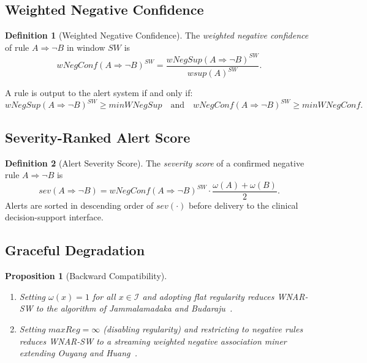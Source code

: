 \documentclass[10pt,twocolumn]{article}
\theoremstyle{plain}
\newtheorem{proposition}[theorem]{Proposition}
\theoremstyle{definition}
\newtheorem{definition}{Definition}[section]
\theoremstyle{remark}
\newcommand{\wsup}{\mathit{wsup}}
\newcommand{\wNegSup}{\mathit{wNegSup}}
\newcommand{\wNegConf}{\mathit{wNegConf}}
\newcommand{\SW}{\mathit{SW}}
\begin{document}
\subsection{Weighted Negative Confidence}

\begin{definition}[Weighted Negative Confidence]
\label{def:wnegconf}
The \emph{weighted negative confidence} of rule
$A \Rightarrow \lnot B$ in window $\SW$ is
\begin{equation}
  \wNegConf(A \Rightarrow \lnot B)^{\SW}
    = \frac{\wNegSup(A \Rightarrow \lnot B)^{\SW}}{\wsup(A)^{\SW}}.
  \label{eq:wnegconf}
\end{equation}
\end{definition}

A rule is output to the alert system if and only if:
\[
  \wNegSup(A \Rightarrow \lnot B)^{\SW} \geq \mathit{minWNegSup}
  \quad\text{and}\quad
  \wNegConf(A \Rightarrow \lnot B)^{\SW} \geq \mathit{minWNegConf}.
\]

\subsection{Severity-Ranked Alert Score}

\begin{definition}[Alert Severity Score]
\label{def:severity}
The \emph{severity score} of a confirmed negative rule
$A \Rightarrow \lnot B$ is
\begin{equation}
  \mathit{sev}(A \Rightarrow \lnot B)
    = \wNegConf(A \Rightarrow \lnot B)^{\SW}
      \cdot \frac{\omega(A) + \omega(B)}{2}.
  \label{eq:severity}
\end{equation}
Alerts are sorted in descending order of $\mathit{sev}(\cdot)$
before delivery to the clinical decision-support interface.
\end{definition}

\subsection{Graceful Degradation}

\begin{proposition}[Backward Compatibility]
\label{prop:degradation}
\begin{enumerate}[label=(\roman*)]
  \item Setting $\omega(x) = 1$ for all $x \in \mathcal{I}$ and
        adopting flat regularity reduces WNAR-SW to the algorithm
        of Jammalamadaka and Budaraju~\cite{sastry2025}.
  \item Setting $\mathit{maxReg} = \infty$ (disabling regularity)
        and restricting to negative rules reduces WNAR-SW to a
        streaming weighted negative association miner extending
        Ouyang and Huang~\cite{ouyang2015}.
\end{enumerate}
\end{proposition}
\end{document}
